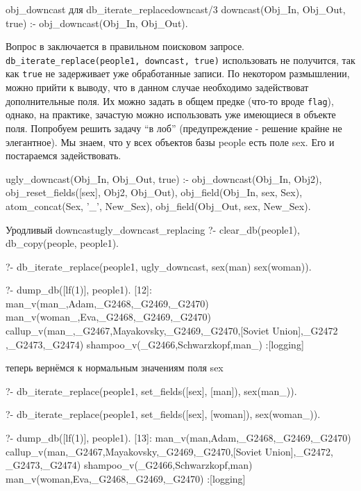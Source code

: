 \documentclass[a4paper]{book}
\begin{document}
\begin{example}{obj_downcast для db_iterate_replace}{downcast/3}
downcast(Obj_In, Obj_Out, true) :- obj_downcast(Obj_In, Obj_Out).
\end{example}

Вопрос в заключается в правильном поисковом
запросе. \verb|db_iterate_replace(people1, downcast, true)|
использовать не получится, так как \verb|true| не задерживает уже
обработанные записи. По некотором размышлении, можно прийти к
выводу, что в данном случае необходимо задействоват
дополнительные поля. Их можно задать в общем предке (что-то вроде
\verb|flag|), однако, на практике, зачастую можно использовать
уже имеющиеся в объекте поля. Попробуем решить задачу ``в лоб''
(предупреждение - решение крайне не элегантное). Мы знаем, что у
всех объектов базы people есть поле sex. Его и постараемся
задействовать.

\begin{example}{}{}
ugly_downcast(Obj_In, Obj_Out, true) :- 
   obj_downcast(Obj_In, Obj2),
   obj_reset_fields([sex], Obj2, Obj_Out),
   obj_field(Obj_In, sex, Sex),
   atom_concat(Sex, '_', New_Sex),
   obj_field(Obj_Out, sex, New_Sex).
\end{example}

\begin{example}{Уродливый downcast}{ugly_downcast_replacing}
?- clear_db(people1), db_copy(people, people1).

?- db_iterate_replace(people1, 
      ugly_downcast, sex(man) \/ sex(woman)).

?- dump_db([lf(1)], people1).
[12]: man_v(man_,Adam,_G2468,_G2469,_G2470) 
man_v(woman_,Eva,_G2468,_G2469,_G2470) 
callup_v(man_,_G2467,Mayakovsky,_G2469,_G2470,[Soviet Union],_G2472
,_G2473,_G2474)                                                   
shampoo_v(_G2466,Schwarzkopf,man_) 
 :[logging]
\end{example}

теперь вернёмся к нормальным значениям поля sex

\begin{example}{}{}
?- db_iterate_replace(people1, 
      set_fields([sex], [man]), sex(man_)).

?- db_iterate_replace(people1, 
      set_fields([sex], [woman]), sex(woman_)).

?- dump_db([lf(1)], people1).
[13]: man_v(man,Adam,_G2468,_G2469,_G2470) 
callup_v(man,_G2467,Mayakovsky,_G2469,_G2470,[Soviet Union],_G2472,
_G2473,_G2474)                                                    
shampoo_v(_G2466,Schwarzkopf,man) 
man_v(woman,Eva,_G2468,_G2469,_G2470) 
 :[logging]
\end{example}
\end{document}
